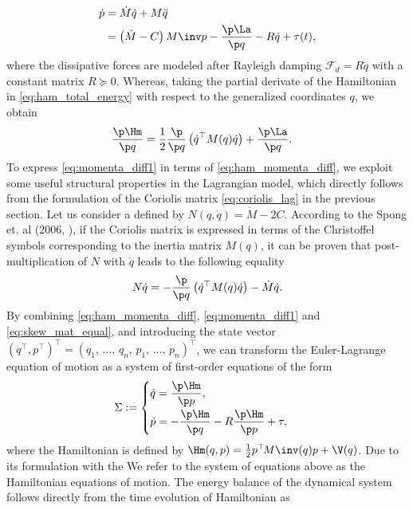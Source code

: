 %
\begin{align}
\dot{p} & = \dot{M}\dot{q} + M\ddot{q}\notag \\
& = \left(\dot{M} - C \right) M\inv p - \frac{\p \La}{ \p q} - R\dot{q} + \tau(t)
\label{eq:momenta_diff1},
\end{align}
%
where the dissipative forces are modeled after Rayleigh damping $\mathcal{F}_d = R\dot{q}$ with a constant matrix $R \succeq 0$. Whereas, taking the partial derivate of the Hamiltonian in \eqref{eq:ham_total_energy} with respect to the generalized coordinates $q$, we obtain 
%
\begin{align}
\frac{\p \Hm}{\p q} & = \frac{1}{2} \frac{\p}{\p q} \left( \dot{q}^\top M(q) \dot{q} \right) + \frac{\p \La}{ \p q}.
\label{eq:ham_momenta_diff}
\end{align}
%
To express \eqref{eq:momenta_diff1} in terms of \eqref{eq:ham_momenta_diff}, we exploit some useful structural properties in the Lagrangian model, which directly follows from the formulation of the Coriolis matrix \eqref{eq:coriolis_lag} in the previous section. Let us consider a defined by $N(q,\dot{q}) = \dot{M} - 2C$. According to the Spong et. al (2006, \cite{Spong2006}), if the Coriolis matrix is expressed in terms of the Christoffel symbols corresponding to the inertia matrix $M(q)$, it can be proven that post-multiplication of $N$ with $\dot{q}$ leads to the following equality
%
\begin{equation}
N \dot{q} =  -\frac{\p}{\p q} \left( \dot{q}^\top M(q) \dot{q} \right) -  \dot{M}\dot{q}. \label{eq:skew_mat_equal}
\end{equation}
%
By combining \eqref{eq:ham_momenta_diff}, \eqref{eq:momenta_diff1} and \eqref{eq:skew_mat_equal}, and introducing the state vector $({q}^\top\! ,p^\top )^\top = (q_1,\,...,\,q_n,\,p_1,\,...,\,p_n)^\top$, we can transform the Euler-Lagrange equation of motion as a system of first-order equations of the form
%
\begin{equation}
\Sigma:=
\begin{cases}
\dot{q} = \dfrac{\p \Hm}{\p p}, \\[0.75em]
\dot{p} = -\dfrac{\p \Hm}{\p q} - R\dfrac{\p \Hm}{\p p} + \tau, 
\end{cases}
\label{eq:ham_eq_motion}
\end{equation}
%
where the Hamiltonian is defined by $\Hm(q,p) = \frac{1}{2}p^\top \! M\inv(q)p + \V(q)$. Due to its formulation with the We refer to the system of equations above as the Hamiltonian equations of motion. The energy balance of the dynamical system follows directly from the time evolution of Hamiltonian as
